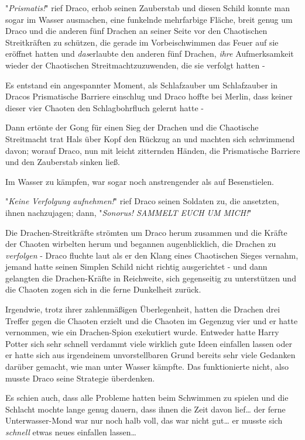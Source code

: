 {"\emph{Prismatis!}" rief Draco, erhob seinen Zauberstab und diesen Schild konnte man sogar im Wasser ausmachen, eine funkelnde mehrfarbige Fläche, breit genug um Draco und die anderen fünf Drachen an seiner Seite vor den Chaotischen Streitkräften zu schützen, die gerade im Vorbeischwimmen das Feuer auf sie eröffnet hatten und \emph{das}erlaubte den anderen fünf Drachen, \emph{ihre} Aufmerksamkeit wieder der Chaotischen Streitmachtzuzuwenden, die sie verfolgt hatten -

Es entstand ein angespannter Moment, als Schlafzauber um Schlafzauber in Dracos Prismatische Barriere einschlug und Draco hoffte bei Merlin, dass keiner dieser vier Chaoten den Schlagbohrfluch gelernt hatte -

Dann ertönte der Gong für einen Sieg der Drachen und die Chaotische Streitmacht trat Hals über Kopf den Rückzug an und machten sich schwimmend davon; worauf Draco, nun mit leicht zitternden Händen, die Prismatische Barriere und den Zauberstab sinken ließ.

Im Wasser zu kämpfen, war sogar noch anstrengender als auf Besenstielen.

"\emph{Keine Verfolgung aufnehmen!}" rief Draco seinen Soldaten zu, die ansetzten, ihnen nachzujagen; dann, "\emph{Sonorus! SAMMELT EUCH UM MICH!}"

Die Drachen-Streitkräfte strömten um Draco herum zusammen und die Kräfte der Chaoten wirbelten herum und begannen augenblicklich, die Drachen zu \emph{verfolgen} - Draco fluchte laut als er den Klang eines Chaotischen Sieges vernahm, jemand hatte seinen Simplen Schild nicht richtig ausgerichtet - und dann gelangten die Drachen-Kräfte in Reichweite, sich gegenseitig zu unterstützen und die Chaoten zogen sich in die ferne Dunkelheit zurück.

Irgendwie, trotz ihrer zahlenmäßigen Überlegenheit, hatten die Drachen drei Treffer gegen die Chaoten erzielt und die Chaoten im Gegenzug vier und er hatte vernommen, wie ein Drachen-Spion exekutiert wurde. Entweder hatte Harry Potter sich sehr schnell verdammt viele wirklich gute Ideen einfallen lassen oder er hatte sich aus irgendeinem unvorstellbaren Grund bereits sehr viele Gedanken darüber gemacht, wie man unter Wasser kämpfte. Das funktionierte nicht, also musste Draco seine Strategie überdenken.

Es schien auch, dass alle Probleme hatten beim Schwimmen zu spielen und die Schlacht mochte lange genug dauern, dass ihnen die Zeit davon lief… der ferne Unterwasser-Mond war nur noch halb voll, das war nicht gut… er musste sich \emph{schnell} etwas neues einfallen lassen…

}
